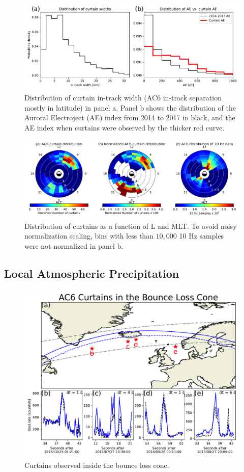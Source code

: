 \documentclass[draft]{agujournal2019}
\begin{document}
\begin{figure}
\includegraphics[width=\textwidth]{ac6_curtains_ae_width_dist.pdf}
\caption{Distribution of curtain in-track width (AC6 in-track separation mostly in latitude) in panel a. Panel b shows the distribution of the Auroral Electroject (AE) index from 2014 to 2017 in black, and the AE index when curtains were observed by the thicker red curve.}
\label{ae_width_dist}
\end{figure}


\begin{figure}
\includegraphics[width=\textwidth]{fig2.pdf}
\caption{Distribution of curtains as a function of L and MLT. To avoid noisy normalization scaling, bins with less than $10,000$ 10 Hz samples were not normalized in panel b.}
\label{fig2}
\end{figure}


\subsection{Local Atmospheric Precipitation}
\begin{figure}
\includegraphics[width=\textwidth]{fig3.pdf}
\caption{Curtains observed inside the bounce loss cone.}
\label{fig3}
\end{figure}
\end{document}
